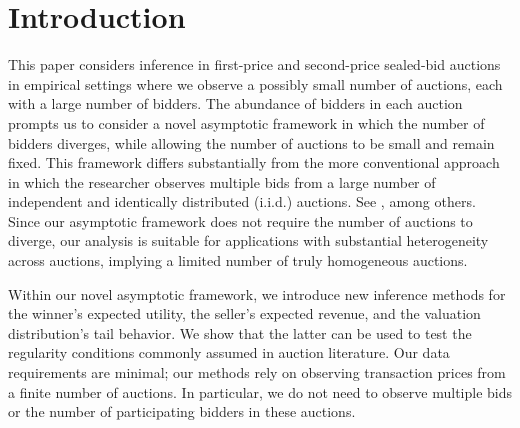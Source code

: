 \section{Introduction}

This paper considers inference in first-price and second-price sealed-bid auctions in empirical settings where we observe a possibly small number of auctions, each with a large number of bidders. The abundance of bidders in each auction prompts us to consider a novel asymptotic framework in which the number of bidders diverges, while allowing the number of auctions to be small and remain fixed. This framework differs substantially from the more conventional approach in which the researcher observes multiple bids from a large number of independent and identically distributed (i.i.d.) auctions. See \citet{athey2002,hailetamer2003,athey2007handbook,guerre2000}, among others. Since our asymptotic framework does not require the number of auctions to diverge, our analysis is suitable for applications with substantial heterogeneity across auctions, implying a limited number of truly homogeneous auctions. 

Within our novel asymptotic framework, we introduce new inference methods for the winner's expected utility, the seller's expected revenue, and the valuation distribution's tail behavior. We show that the latter can be used to test the regularity conditions commonly assumed in auction literature. Our data requirements are minimal; our methods rely on observing transaction prices from a finite number of auctions. In particular, we do not need to observe multiple bids or the number of participating bidders in these auctions.

